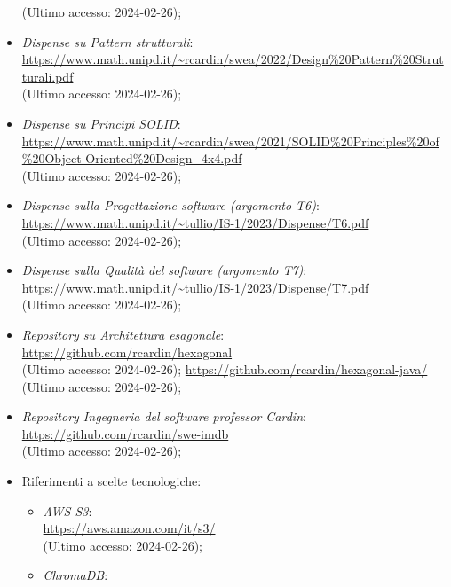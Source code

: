 \documentclass[10pt, a4paper]{article}
\begin{document}
\begin{itemize}
            (Ultimo accesso: 2024-02-26);
        \item \textit{Dispense su Pattern strutturali}: \\
            \url{https://www.math.unipd.it/~rcardin/swea/2022/Design%20Pattern%20Strutturali.pdf}\\
            (Ultimo accesso: 2024-02-26);
        \item \textit{Dispense su Principi SOLID}: \\
            \url{https://www.math.unipd.it/~rcardin/swea/2021/SOLID%20Principles%20of%20Object-Oriented%20Design_4x4.pdf}\\
            (Ultimo accesso: 2024-02-26);
        \item \textit{Dispense sulla Progettazione software (argomento T6)}: \\
            \url{https://www.math.unipd.it/~tullio/IS-1/2023/Dispense/T6.pdf}\\
            (Ultimo accesso: 2024-02-26);
        \item \textit{Dispense sulla Qualità del software (argomento T7)}: \\
            \url{https://www.math.unipd.it/~tullio/IS-1/2023/Dispense/T7.pdf}\\
            (Ultimo accesso: 2024-02-26);
        \item \textit{Repository su Architettura esagonale}: \\
            \url{https://github.com/rcardin/hexagonal}\\
            (Ultimo accesso: 2024-02-26);
            \url{https://github.com/rcardin/hexagonal-java/}\\
            (Ultimo accesso: 2024-02-26);
        \item \textit{Repository Ingegneria del software professor Cardin}: \\
            \url{https://github.com/rcardin/swe-imdb}\\
            (Ultimo accesso: 2024-02-26);
        \item Riferimenti a scelte tecnologiche:
        \begin{itemize}
            \item \textit{AWS S3}: \\
                \url{https://aws.amazon.com/it/s3/}\\
                (Ultimo accesso: 2024-02-26);
            \item \textit{ChromaDB}: \\

\end{itemize}
\end{itemize}
\end{document}

